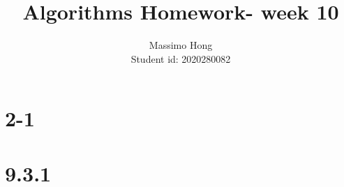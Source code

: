 \documentclass{article}
\title{Algorithms Homework- week 10}
\author{
	Massimo Hong\\
	Student id: 2020280082\\
 }
\begin{document}
\maketitle
\section*{2-1}

\section*{9.3.1}

\end{document}
